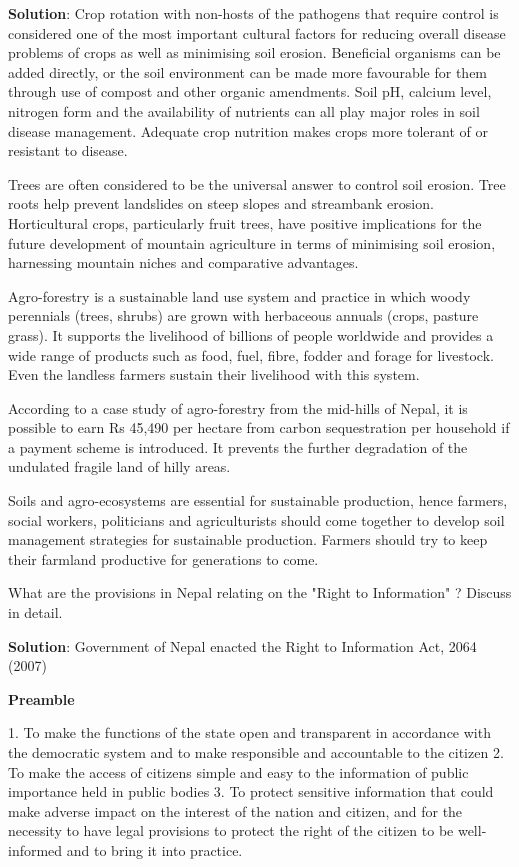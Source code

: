 \documentclass[
]{book}
\newcommand{\question}{\item}
\newenvironment{solution}{ {\bfseries Solution}:}{}
\begin{document}
\begin{questions}
\begin{solution}
Crop rotation with non-hosts of the pathogens that require control is considered one of the most important cultural factors for reducing overall disease problems of crops as well as minimising soil erosion. Beneficial organisms can be added directly, or the soil environment can be made more favourable for them through use of compost and other organic amendments. Soil pH, calcium level, nitrogen form and the availability of nutrients can all play major roles in soil disease management. Adequate crop nutrition makes crops more tolerant of or resistant to disease.

Trees are often considered to be the universal answer to control soil erosion. Tree roots help prevent landslides on steep slopes and streambank erosion. Horticultural crops, particularly fruit trees, have positive implications for the future development of mountain agriculture in terms of minimising soil erosion, harnessing mountain niches and comparative advantages.

Agro-forestry is a sustainable land use system and practice in which woody perennials (trees, shrubs) are grown with herbaceous annuals (crops, pasture grass). It supports the livelihood of billions of people worldwide and provides a wide range of products such as food, fuel, fibre, fodder and forage for livestock. Even the landless farmers sustain their livelihood with this system.

According to a case study of agro-forestry from the mid-hills of Nepal, it is possible to earn Rs 45,490 per hectare from carbon sequestration per household if a payment scheme is introduced. It prevents the further degradation of the undulated fragile land of hilly areas.

Soils and agro-ecosystems are essential for sustainable production, hence farmers, social workers, politicians and agriculturists should come together to develop soil management strategies for sustainable production. Farmers should try to keep their farmland productive for generations to come.
\end{solution}

\question What are the provisions in Nepal relating on the "Right to Information" ? Discuss in detail.

\begin{solution}
Government of Nepal enacted the Right to Information Act, 2064 (2007)

\textbf{Preamble}

1. To make the functions of the state open and transparent in accordance with the democratic system and to make responsible and accountable to the citizen
2. To make the access of citizens simple and easy to the information of public importance held in public bodies
3. To protect sensitive information that could make adverse impact on the interest of the nation and citizen, and for the necessity to have legal provisions to protect the right of the citizen to be well-informed and to bring it into practice.


\end{solution}
\end{questions}
\end{document}
